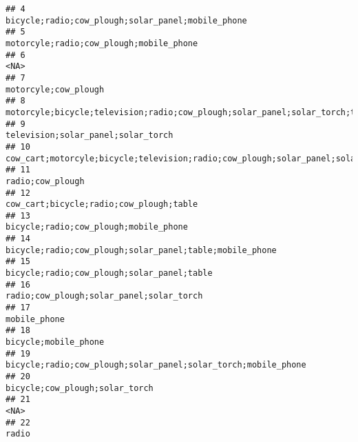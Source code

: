 \documentclass[
]{article}
\begin{document}
\begin{verbatim}
## 4                                                                                          bicycle;radio;cow_plough;solar_panel;mobile_phone
## 5                                                                                                    motorcyle;radio;cow_plough;mobile_phone
## 6                                                                                                                                       <NA>
## 7                                                                                                                       motorcyle;cow_plough
## 8                                                         motorcyle;bicycle;television;radio;cow_plough;solar_panel;solar_torch;table;fridge
## 9                                                                                                         television;solar_panel;solar_torch
## 10                                                      cow_cart;motorcyle;bicycle;television;radio;cow_plough;solar_panel;solar_torch;table
## 11                                                                                                                          radio;cow_plough
## 12                                                                                                   cow_cart;bicycle;radio;cow_plough;table
## 13                                                                                                     bicycle;radio;cow_plough;mobile_phone
## 14                                                                                   bicycle;radio;cow_plough;solar_panel;table;mobile_phone
## 15                                                                                                bicycle;radio;cow_plough;solar_panel;table
## 16                                                                                                  radio;cow_plough;solar_panel;solar_torch
## 17                                                                                                                              mobile_phone
## 18                                                                                                                      bicycle;mobile_phone
## 19                                                                             bicycle;radio;cow_plough;solar_panel;solar_torch;mobile_phone
## 20                                                                                                            bicycle;cow_plough;solar_torch
## 21                                                                                                                                      <NA>
## 22                                                                                                                                     radio

\end{verbatim}
\end{document}
